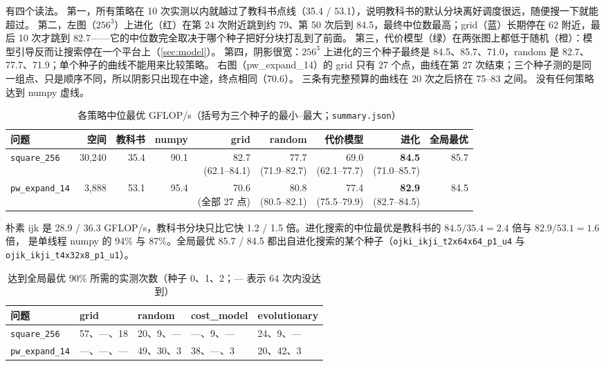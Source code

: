 \documentclass[11pt,a4paper]{ctexart}
\newcommand{\sk}[1]{\texttt{#1}}
\begin{document}
 有四个读法。
第一，所有策略在 10 次实测以内就越过了教科书点线（35.4 / 53.1），说明教科书的默认分块离好调度很远，随便搜一下就能超过。
第二，左图（$256^3$）上进化（红）在第 24 次附近跳到约 79、第 50 次后到 84.5，最终中位数最高；grid（蓝）长期停在 62 附近，最后 10 次才跳到 82.7——它的中位数完全取决于哪个种子把好分块打乱到了前面。
第三，代价模型（绿）在两张图上都低于随机（橙）：模型引导反而让搜索停在一个平台上（\cref{sec:model}）。
第四，阴影很宽：$256^3$ 上进化的三个种子最终是 84.5、85.7、71.0，random 是 82.7、77.7、71.9；单个种子的曲线不能用来比较策略。
右图（pw\_expand\_14）的 grid 只有 27 个点，曲线在第 27 次结束；三个种子测的是同一组点、只是顺序不同，所以阴影只出现在中途，终点相同（70.6）。
三条有完整预算的曲线在 20 次之后挤在 75--83 之间。
没有任何策略达到 numpy 虚线。

\begin{table}[H]
\centering\small
\caption{各策略中位最优 GFLOP/s（括号为三个种子的最小--最大；\texttt{summary.json}）}\label{tab:main}
\setlength{\tabcolsep}{4pt}
\begin{tabular}{lrrrrrrrr}
\toprule
问题 & 空间 & 教科书 & numpy & grid & random & 代价模型 & 进化 & 全局最优 \\
\midrule
\sk{square\_256} & 30,240 & 35.4 & 90.1 & \makecell[r]{82.7\\(62.1--84.1)} & \makecell[r]{77.7\\(71.9--82.7)} & \makecell[r]{69.0\\(62.1--77.7)} & \makecell[r]{\textbf{84.5}\\(71.0--85.7)} & 85.7 \\
\addlinespace
\sk{pw\_expand\_14} & 3,888 & 53.1 & 95.4 & \makecell[r]{70.6\\(全部 27 点)} & \makecell[r]{80.8\\(80.5--82.1)} & \makecell[r]{77.4\\(75.5--79.9)} & \makecell[r]{\textbf{82.9}\\(82.7--84.5)} & 84.5 \\
\bottomrule
\end{tabular}
\end{table}

朴素 ijk 是 28.9 / 36.3 GFLOP/s，教科书分块只比它快 1.2 / 1.5 倍。进化搜索的中位最优是教科书的 $84.5/35.4=2.4$ 倍与 $82.9/53.1=1.6$ 倍，
是单线程 numpy 的 94\% 与 87\%。全局最优 85.7 / 84.5 都出自进化搜索的某个种子（\sk{ojki\_ikji\_t2x64x64\_p1\_u4} 与 \sk{ojik\_ikji\_t4x32x8\_p1\_u1}）。

\begin{table}[H]
\centering\small
\caption{达到全局最优 90\% 所需的实测次数（种子 0、1、2；— 表示 64 次内没达到）}\label{tab:trials90}
\begin{tabular}{lllll}
\toprule
问题 & grid & random & cost\_model & evolutionary \\
\midrule
\sk{square\_256} & 57、—、18 & 20、9、— & —、9、— & 24、9、— \\
\sk{pw\_expand\_14} & —、—、— & 49、30、3 & 38、—、3 & 20、42、3 \\
\bottomrule
\end{tabular}
\end{table}
\end{document}
